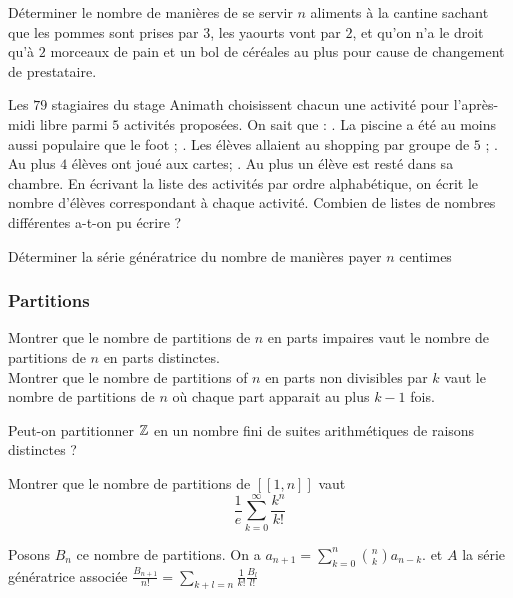 
\begin{exo}
Déterminer le nombre de manières de se servir $n$ aliments à la cantine sachant que les pommes sont prises par $3$, les yaourts vont par $2$, et qu'on n'a le droit qu'à $2$ morceaux de pain et un bol de céréales au plus pour cause de changement de prestataire.
\end{exo}

\begin{exo}
Les $79$ stagiaires du stage Animath choisissent chacun une activité pour l’après-midi libre parmi $5$ activités proposées. On sait que :
. La piscine a été au moins aussi populaire que le foot ;
. Les élèves allaient au shopping par groupe de $5$ ;
. Au plus $4$ élèves ont joué aux cartes;
. Au plus un élève est resté dans sa chambre.
En écrivant la liste des activités par ordre alphabétique, on écrit le nombre d’élèves correspondant à chaque activité. Combien de listes de nombres différentes a-t-on pu écrire ?
\end{exo}

\begin{exo}
Déterminer la série génératrice du nombre de manières payer $n$ centimes
\end{exo}

\subsubsection{Partitions}

\begin{exo}
Montrer que le nombre de partitions de $n$ en parts impaires vaut le nombre de partitions de $n$ en parts distinctes. \\
Montrer que le nombre de partitions of $n$ en parts non divisibles par $k$ vaut le nombre de partitions de $n$ où chaque part apparait au plus $k - 1$ fois.
\end{exo}

\begin{exo}
Peut-on partitionner $\mathbb Z$ en un nombre fini de suites arithmétiques de raisons distinctes ?
\end{exo}


\begin{exo}
Montrer que le nombre de partitions de $[\![1, n]\!]$ vaut
$$\frac 1e \sum_{k=0}^\infty \frac{k^n}{k!} $$
\end{exo}
\begin{sol}
Posons $B_n$ ce nombre de partitions. On a $a_{n+1} = \sum_{k=0}^n {n \choose k} a_{n - k}$. et $A$ la série génératrice associée
$\frac{B_{n+1}}{n!} = \sum_{k+l=n} \frac 1{k!}\frac{B_l}{l!}$
\end{sol}

